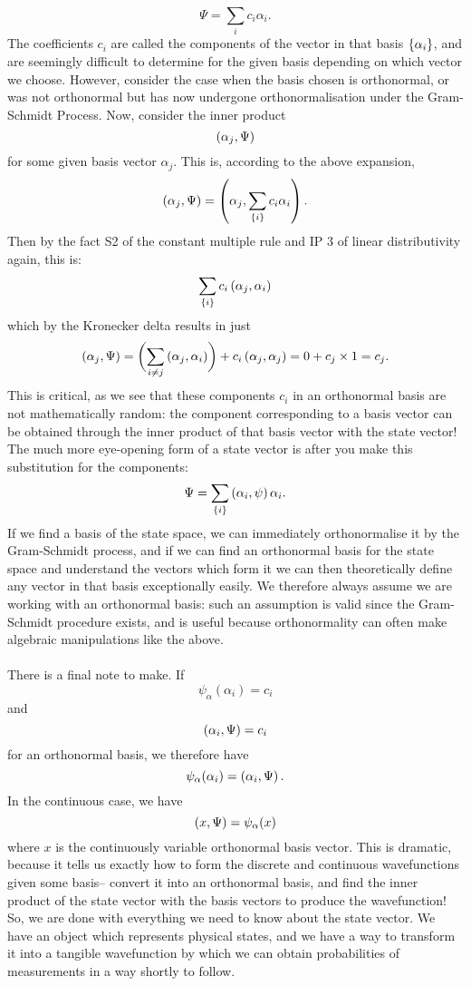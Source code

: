 $$
\Psi=\sum_{i}c_{i}\alpha_{i}.
$$
The coefficients $c_{i}$ are called the components of the vector in that basis $\{\alpha_{i}\}$, and are seemingly difficult to determine for the given basis depending on which vector we choose. However, consider the case when the basis chosen is orthonormal, or was not orthonormal but has now undergone orthonormalisation under the Gram-Schmidt Process. Now, consider the inner product
$$
\left(\alpha_{j},\Psi\right)
$$
for some given basis vector $\alpha_{j}$. This is, according to the above expansion,
$$
\left(\alpha_{j},\Psi\right)=\left(\alpha_{j},\sum_{\{i\}}c_{i}\alpha_{i}\right).
$$
Then by the fact S2 of the constant multiple rule and IP 3 of linear distributivity again, this is:
$$
\sum_{\{i\}}c_{i}\left(\alpha_{j},\alpha_{i}\right)
$$
which by the Kronecker delta results in just 
$$
\left(\alpha_{j},\Psi\right)=\biggl(\sum_{i\neq j}\left(\alpha_{j},\alpha_{i}\right)\biggr)+c_{i}\left(\alpha_{j},\alpha_{j}\right)=0+c_{j}\times 1=c_{j}.
$$
This is critical, as we see that these components $c_{i}$ in an orthonormal basis are not mathematically random: the component corresponding to a basis vector can be obtained through the inner product of that basis vector with the state vector! The much more eye-opening form of a state vector is after you make this substitution for the components:
$$
\Psi=\sum_{\{i\}}\left(\alpha_{i},\psi\right)\alpha_{i}.
$$
If we find a basis of the state space, we can immediately orthonormalise it by the Gram-Schmidt process, and if we can find an orthonormal basis for the state space and understand the vectors which form it we can then theoretically define any vector in that basis exceptionally easily. We therefore always assume we are working with an orthonormal basis: such an assumption is valid since the Gram-Schmidt procedure exists, and is useful because orthonormality can often make algebraic manipulations like the above.
\\\\
There is a final note to make. If 
$$
{\psi}_{\alpha}(\alpha_{i})=c_{i}
$$
and 
$$
\left(\alpha_{i},\Psi\right)=c_{i}
$$
for an orthonormal basis, we therefore have 
$$
{\psi}_{\alpha}(\alpha_{i})=\left(\alpha_{i},\Psi\right).
$$
In the continuous case, we have 
$$
\left(x,\Psi\right)=\psi_{\alpha}(x)
$$
where $x$ is the continuously variable orthonormal basis vector. This is dramatic, because it tells us exactly how to form the discrete and continuous wavefunctions given some basis-- convert it into an orthonormal basis, and find the inner product of the state vector with the basis vectors to produce the wavefunction! So, we are done with everything we need to know about the state vector. We have an object which represents physical states, and we have a way to transform it into a tangible wavefunction by which we can obtain probabilities of measurements in a way shortly to follow.

